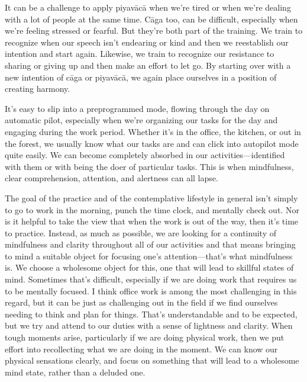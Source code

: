 It can be a challenge to apply piyavācā when we're tired or when 
we're dealing with a lot of people at the same time. Cāga too, can be 
difficult, especially when we're feeling stressed or fearful. But 
they're both part of the training. We train to recognize when our 
speech isn't endearing or kind and then we reestablish our intention 
and start again. Likewise, we train to recognize our resistance to 
sharing or giving up and then make an effort to let go. By starting 
over with a new intention of cāga or piyavācā, we again place 
ourselves in a position of creating harmony.


It's easy to slip into a preprogrammed mode, flowing through the day on 
automatic pilot, especially when we're organizing our tasks for the day 
and engaging during the work period. Whether it's in the office, the 
kitchen, or out in the forest, we usually know what our tasks are and 
can click into autopilot mode quite easily. We can become completely 
absorbed in our activities---identified with them or with being the 
doer of particular tasks. This is when mindfulness, clear 
comprehension, attention, and alertness can all lapse.

The goal of the practice and of the contemplative lifestyle in general 
isn't simply to go to work in the morning, punch the time clock, and 
mentally check out. Nor is it helpful to take the view that when the 
work is out of the way, then it's time to practice. Instead, as much as 
possible, we are looking for a continuity of mindfulness and clarity 
throughout all of our activities and that means bringing to mind a 
suitable object for focusing one's attention---that's what mindfulness 
is. We choose a wholesome object for this, one that will lead to 
skillful states of mind. Sometimes that's difficult, especially if we 
are doing work that requires us to be mentally focused. I think office 
work is among the most challenging in this regard, but it can be just 
as challenging out in the field if we find ourselves needing to think 
and plan for things. That's understandable and to be expected, but we 
try and attend to our duties with a sense of lightness and clarity. 
When tough moments arise, particularly if we are doing physical work, 
then we put effort into recollecting what we are doing in the moment. 
We can know our physical sensations clearly, and focus on something 
that will lead to a wholesome mind state, rather than a deluded one.

